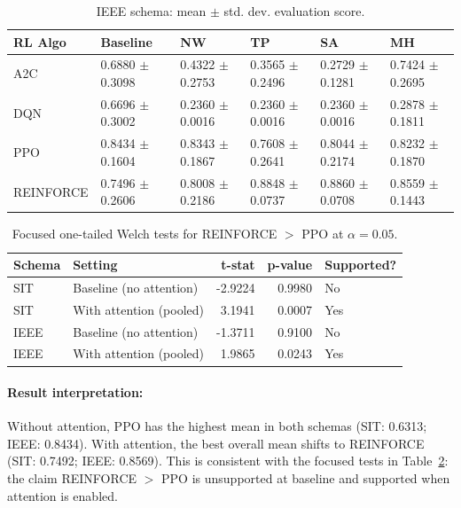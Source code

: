 \documentclass[sn-basic]{sn-jnl}%
\begin{document}
\begin{table}[htbp]
	\centering
	\caption{IEEE schema: mean $\pm$ std. dev. evaluation score.}
	\label{tab:ieee_main_results}
	\begin{tabular}{l l l l l l}
	\toprule
	\textbf{RL Algo} & \textbf{Baseline} & \textbf{NW} & \textbf{TP} & \textbf{SA} & \textbf{MH}\\
	\midrule
	A2C & 0.6880 $\pm$ 0.3098 & 0.4322 $\pm$ 0.2753 & 0.3565 $\pm$ 0.2496 & 0.2729 $\pm$ 0.1281 & 0.7424 $\pm$ 0.2695\\
	DQN & 0.6696 $\pm$ 0.3002 & 0.2360 $\pm$ 0.0016 & 0.2360 $\pm$ 0.0016 & 0.2360 $\pm$ 0.0016 & 0.2878 $\pm$ 0.1811\\
	PPO & 0.8434 $\pm$ 0.1604 & 0.8343 $\pm$ 0.1867 & 0.7608 $\pm$ 0.2641 & 0.8044 $\pm$ 0.2174 & 0.8232 $\pm$ 0.1870\\
	REINFORCE & 0.7496 $\pm$ 0.2606 & 0.8008 $\pm$ 0.2186 & 0.8848 $\pm$ 0.0737 & 0.8860 $\pm$ 0.0708 & 0.8559 $\pm$ 0.1443\\
	\bottomrule
	\end{tabular}
\end{table}

\begin{table}[htbp]
	\centering
	\caption{Focused one-tailed Welch tests for \textsc{REINFORCE} $>$ \textsc{PPO} at $\alpha=0.05$.}
	\label{tab:rf_vs_ppo_tests}
	\begin{tabular}{l l r r l}
	\toprule
	\textbf{Schema} & \textbf{Setting} & \textbf{t-stat} & \textbf{p-value} & \textbf{Supported?}\\
	\midrule
	SIT & Baseline (no attention) & -2.9224 & 0.9980 & No\\
	SIT & With attention (pooled) & 3.1941 & 0.0007 & Yes\\
	IEEE & Baseline (no attention) & -1.3711 & 0.9100 & No\\
	IEEE & With attention (pooled) & 1.9865 & 0.0243 & Yes\\
	\bottomrule
	\end{tabular}
\end{table}

\paragraph{Result interpretation:}
Without attention, \textsc{PPO} has the highest mean in both schemas (SIT: 0.6313; IEEE: 0.8434). With attention, the best overall mean shifts to \textsc{REINFORCE} (SIT: 0.7492; IEEE: 0.8569). This is consistent with the focused tests in Table~\ref{tab:rf_vs_ppo_tests}: the claim \textsc{REINFORCE} $>$ \textsc{PPO} is unsupported at baseline and supported when attention is enabled.
\end{document}
